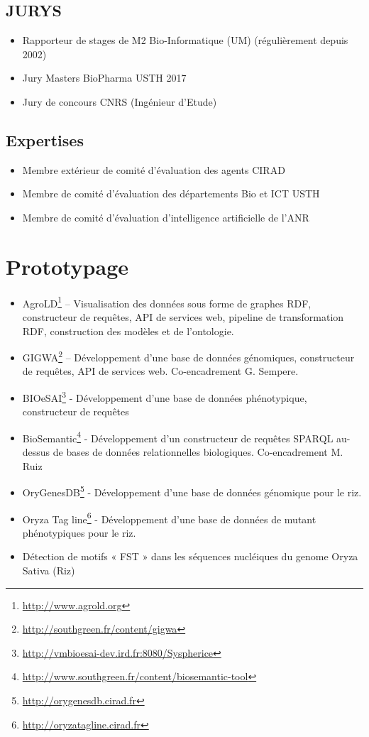 \subsection*{JURYS}
\begin{itemize}
\item Rapporteur de stages de M2 Bio-Informatique (UM) (régulièrement depuis 2002)
\item Jury Masters BioPharma USTH 2017
\item Jury de concours CNRS (Ingénieur d’Etude)
\end{itemize}

\subsection*{Expertises}
\begin{itemize}
\item Membre extérieur de comité d’évaluation des agents CIRAD
\item Membre de comité d'évaluation des départements Bio et ICT USTH
\item Membre de comité d'évaluation d'intelligence artificielle de l'ANR
\end{itemize}


\section{Prototypage}
\begin{itemize}
\item  AgroLD\footnote{\url{http://www.agrold.org}} – Visualisation des données sous forme de graphes RDF, constructeur de requêtes, API de services web, pipeline de transformation RDF, construction des modèles et de l'ontologie.
% 
\item GIGWA\footnote{\url{http://southgreen.fr/content/gigwa}}  – Développement d’une base de données génomiques, constructeur de requêtes, API de services web. Co-encadrement G. Sempere.
% 
\item BIOeSAI\footnote{\url{http://vmbioesai-dev.ird.fr:8080/Syspherice}} - Développement d’une base de données phénotypique, constructeur de requêtes 
\item BioSemantic\footnote{\url{http://www.southgreen.fr/content/biosemantic-tool}} - Développement d’un constructeur de requêtes SPARQL au-dessus de bases de données relationnelles biologiques. Co-encadrement M. Ruiz
%
\item OryGenesDB\footnote{\url{ http://orygenesdb.cirad.fr}} - Développement d’une base de données génomique pour le riz.
\item Oryza Tag line\footnote{\url{http://oryzatagline.cirad.fr}} - Développement d’une base de données de mutant phénotypiques pour le riz.  
\item Détection de motifs « FST » dans les séquences nucléiques du genome Oryza Sativa (Riz)
\end{itemize}
%